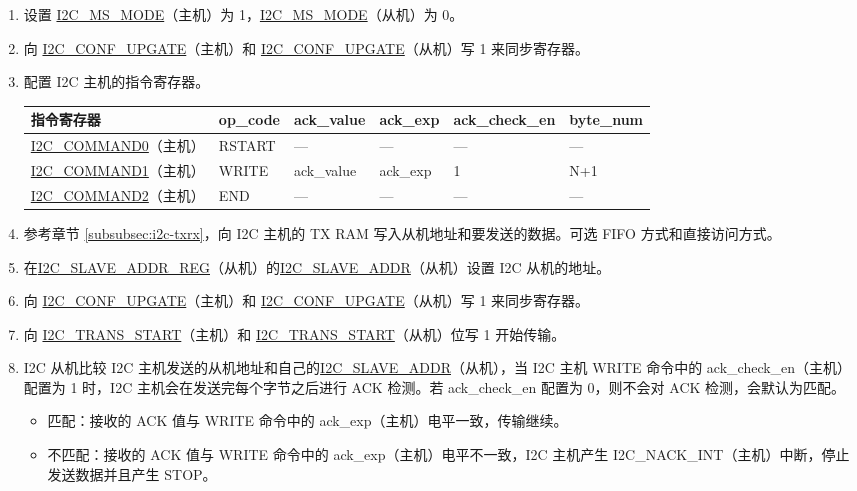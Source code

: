 \documentclass[main\_\_CN.tex]{subfiles}
\begin{document}
\begin{enumerate}
\item 设置 \hyperref[fielddesc:I2CMSMODE]{I2C\_MS\_MODE}（主机）为 1，\hyperref[fielddesc:I2CMSMODE]{I2C\_MS\_MODE}（从机）为 0。
\item 向 \hyperref[fielddesc:I2CCONFUPGATE]{I2C\_CONF\_UPGATE}（主机）和 \hyperref[fielddesc:I2CCONFUPGATE]{I2C\_CONF\_UPGATE}（从机）写 1 来同步寄存器。
\item 配置 I2C 主机的指令寄存器。
\begin{longtable}{ | p{4cm} | p{2cm} | p{2cm} | p{2cm} |p{2cm} | p{2cm} |}
\hline\rowcolor{lightgray}
指令寄存器& op\_code & ack\_value&ack\_exp&ack\_check\_en&byte\_num  \\ \hline
\hyperref[fielddesc:I2CCOMMAND0]{I2C\_COMMAND0}（主机）& RSTART& ---&---&---&---  \\ \hline
\hyperref[fielddesc:I2CCOMMAND1]{I2C\_COMMAND1}（主机）& WRITE& ack\_value&ack\_exp&1&N+1  \\ \hline
\hyperref[fielddesc:I2CCOMMAND2]{I2C\_COMMAND2}（主机）& END& ---&---&---&---  \\ \hline
\end{longtable}
\item 参考章节 \ref{subsubsec:i2c-txrx}，向 I2C 主机的 TX RAM 写入从机地址和要发送的数据。可选 FIFO 方式和直接访问方式。
\item 在\hyperref[regdesc:I2CSLAVEADDRREG]{I2C\_SLAVE\_ADDR\_REG}（从机）的\hyperref[fielddesc:I2CSLAVEADDR]{I2C\_SLAVE\_ADDR}（从机）设置 I2C 从机的地址。
\item 向 \hyperref[fielddesc:I2CCONFUPGATE]{I2C\_CONF\_UPGATE}（主机）和 \hyperref[fielddesc:I2CCONFUPGATE]{I2C\_CONF\_UPGATE}（从机）写 1 来同步寄存器。
\item 向 \hyperref[fielddesc:I2CTRANSSTART]{I2C\_TRANS\_START}（主机）和 \hyperref[fielddesc:I2CTRANSSTART]{I2C\_TRANS\_START}（从机）位写 1 开始传输。
\item I2C 从机比较 I2C 主机发送的从机地址和自己的\hyperref[fielddesc:I2CSLAVEADDR]{I2C\_SLAVE\_ADDR}（从机），当 I2C 主机 WRITE 命令中的 ack\_check\_en（主机）配置为 1 时，I2C 主机会在发送完每个字节之后进行 ACK 检测。若 ack\_check\_en 配置为 0，则不会对 ACK 检测，会默认为匹配。
\begin{itemize}
\item 匹配：接收的 ACK 值与 WRITE 命令中的 ack\_exp（主机）电平一致，传输继续。
\item 不匹配：接收的 ACK 值与 WRITE 命令中的 ack\_exp（主机）电平不一致，I2C 主机产生 I2C\_NACK\_INT（主机）中断，停止发送数据并且产生 STOP。

\end{itemize}
\end{enumerate}
\end{document}
